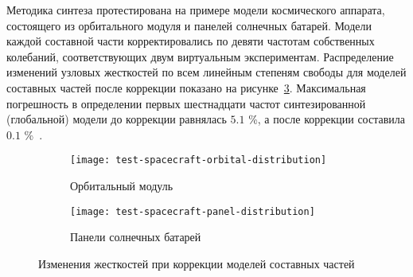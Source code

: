 Методика синтеза протестирована на примере модели космического аппарата, состоящего из орбитального модуля и панелей солнечных батарей. Модели каждой составной части корректировались по девяти частотам собственных колебаний, соответствующих двум виртуальным экспериментам. Распределение изменений узловых жесткостей по всем линейным степеням свободы для моделей составных частей после коррекции показано на рисунке~\ref{fig:test-spacecraft-distribution}. Максимальная погрешность в определении первых шестнадцати частот синтезированной (глобальной) модели до коррекции равнялась $ 5.1 $ \%, а после коррекции составила $ 0.1 $ \%~. 
\vspace{-0.5em}
\begin{figure}[H]
	\centering
	\begin{subfigure}[t]{0.41\textwidth}
		\centering
		\texttt{[image: test-spacecraft-orbital-distribution]}
		\caption{Орбитальный модуль} \label{subfig:test-orbital-distribution}
	\end{subfigure}
	\qquad
	\begin{subfigure}[t]{0.39\textwidth}
		\centering
		\texttt{[image: test-spacecraft-panel-distribution]}
		\caption{Панели солнечных батарей} \label{subfig:test-panel-distribution}
	\end{subfigure}
	\vspace{0.7em}
	\caption{Изменения жесткостей при коррекции моделей составных частей} \label{fig:test-spacecraft-distribution} 
\end{figure}

